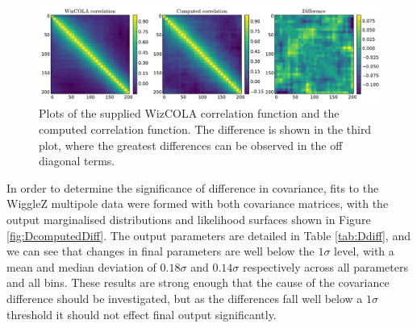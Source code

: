 \documentclass[titlesmallcaps, examinerscopy, copyrightpage]{uqthesis}
\begin{document}
\begin{appendices}
\begin{figure}[h!]
  \begin{center}
    \includegraphics[width=\textwidth]{images/fullCorrelationDifferences.pdf}
  \end{center}
  \caption{Plots of the supplied WizCOLA correlation function and the computed correlation function. The difference is shown in the third plot, where the greatest differences can be observed in the off diagonal terms.}
  \label{fig:DfullCorrelationDifferences}
\end{figure}

In order to determine the significance of difference in covariance, fits to the WiggleZ multipole data were formed with both covariance matrices, with the output marginalised distributions and likelihood surfaces shown in Figure \ref{fig:DcomputedDiff}. The output parameters are detailed in Table \ref{tab:Ddiff}, and we can see that changes in final parameters are well below the $1\sigma$ level, with a mean and median deviation of $0.18\sigma$ and $0.14\sigma$ respectively across all parameters and all bins. These results are strong enough that the cause of the covariance difference should be investigated, but as the differences fall well below a $1\sigma$ threshold it should not effect final output significantly.



\end{appendices}
\end{document}
